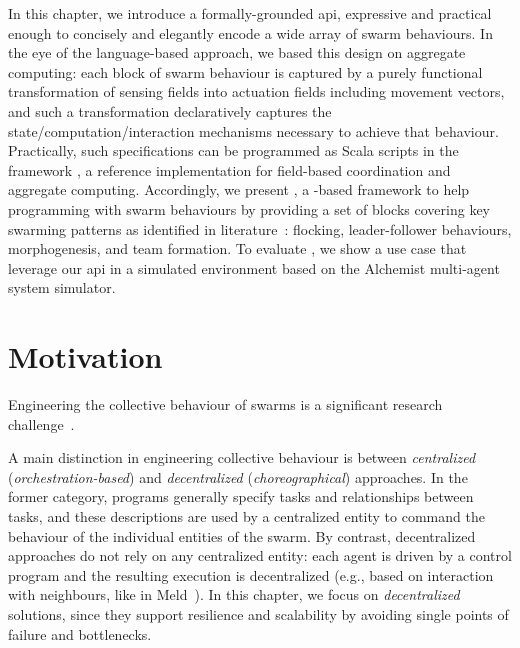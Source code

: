 In this chapter, we introduce a formally-grounded \ac{api},
 expressive and practical enough
 to concisely and elegantly encode a wide array of swarm behaviours.
%
In the eye of the language-based approach, we based this design on aggregate computing:
 each block of swarm behaviour is captured by a purely functional transformation of sensing fields into actuation fields including movement vectors,
 and such a transformation declaratively captures the state/computation/interaction mechanisms necessary to achieve that behaviour.
%
Practically, such specifications can be programmed as Scala scripts in the \scafi{} framework \cite{DBLP:journals/softx/CasadeiVAP22}, 
 a reference implementation for field-based coordination and aggregate computing.
%
Accordingly, we present \MacroSwarm{}, 
 a \scafi{}-based framework to help programming with swarm behaviours by providing a set of blocks covering key swarming patterns as identified in literature~\cite{DBLP:journals/swarm/BrambillaFBD13}: flocking, leader-follower behaviours, morphogenesis, and team formation.
%
To evaluate \MacroSwarm{}, we show a use case that leverage our \ac{api} 
 in a simulated environment based on the Alchemist multi-agent system simulator. 
\section{Motivation}
\label{coordination2023-macro:sec:context}

Engineering the collective behaviour of swarms is 
 a significant research challenge~\cite{DBLP:journals/swarm/BrambillaFBD13}.
%
%
%

A main distinction in engineering collective behaviour is between \emph{centralized} (\emph{orchestration-based}) and \emph{decentralized} (\emph{choreographical}) approaches.
%
In the former category,
 programs generally specify tasks and relationships between tasks, %
 and these descriptions are used by a centralized entity
 to command the behaviour of the individual entities of the swarm.
%
By contrast,
 decentralized approaches
 do not rely on any centralized entity:
 each agent is driven by a control program 
 and the resulting execution is decentralized
 (e.g., based on interaction with neighbours, like in Meld~\cite{Meld2007}).
%
In this chapter,  
 we focus on \emph{decentralized} solutions, 
 since they support resilience and scalability by avoiding single points of failure and bottlenecks.

